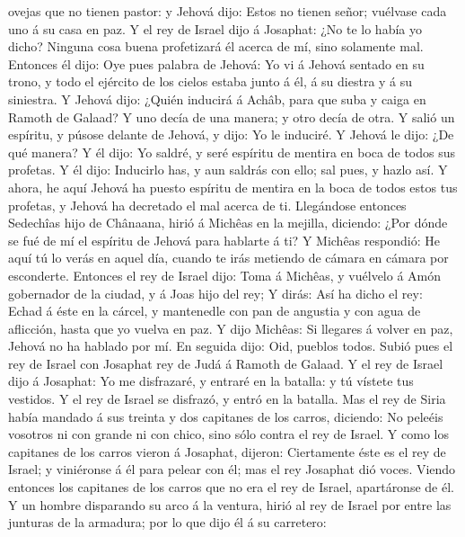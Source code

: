 ovejas que no tienen pastor: y Jehová dijo: Estos no tienen señor;
vuélvase cada uno á su casa en paz.  Y el rey de Israel
dijo á Josaphat: ¿No te lo había yo dicho? Ninguna cosa buena
profetizará él acerca de mí, sino solamente mal. 
Entonces él dijo: Oye pues palabra de Jehová: Yo vi á Jehová sentado en
su trono, y todo el ejército de los cielos estaba junto á él, á su
diestra y á su siniestra.  Y Jehová dijo: ¿Quién inducirá
á Achâb, para que suba y caiga en Ramoth de Galaad? Y uno decía de una
manera; y otro decía de otra.  Y salió un espíritu, y
púsose delante de Jehová, y dijo: Yo le induciré. Y Jehová le dijo: ¿De
qué manera?  Y él dijo: Yo saldré, y seré espíritu de
mentira en boca de todos sus profetas. Y él dijo: Inducirlo has, y aun
saldrás con ello; sal pues, y hazlo así.  Y ahora, he
aquí Jehová ha puesto espíritu de mentira en la boca de todos estos tus
profetas, y Jehová ha decretado el mal acerca de ti. 
Llegándose entonces Sedechîas hijo de Chânaana, hirió á Michêas en la
mejilla, diciendo: ¿Por dónde se fué de mí el espíritu de Jehová para
hablarte á ti?  Y Michêas respondió: He aquí tú lo verás
en aquel día, cuando te irás metiendo de cámara en cámara por
esconderte.  Entonces el rey de Israel dijo: Toma á
Michêas, y vuélvelo á Amón gobernador de la ciudad, y á Joas hijo del
rey;  Y dirás: Así ha dicho el rey: Echad á éste en la
cárcel, y mantenedle con pan de angustia y con agua de aflicción, hasta
que yo vuelva en paz.  Y dijo Michêas: Si llegares á
volver en paz, Jehová no ha hablado por mí. En seguida dijo: Oid,
pueblos todos.  Subió pues el rey de Israel con Josaphat
rey de Judá á Ramoth de Galaad.  Y el rey de Israel dijo
á Josaphat: Yo me disfrazaré, y entraré en la batalla: y tú vístete tus
vestidos. Y el rey de Israel se disfrazó, y entró en la batalla.
 Mas el rey de Siria había mandado á sus treinta y dos
capitanes de los carros, diciendo: No peleéis vosotros ni con grande ni
con chico, sino sólo contra el rey de Israel.  Y como los
capitanes de los carros vieron á Josaphat, dijeron: Ciertamente éste es
el rey de Israel; y viniéronse á él para pelear con él; mas el rey
Josaphat dió voces.  Viendo entonces los capitanes de los
carros que no era el rey de Israel, apartáronse de él.  Y
un hombre disparando su arco á la ventura, hirió al rey de Israel por
entre las junturas de la armadura; por lo que dijo él á su carretero:
